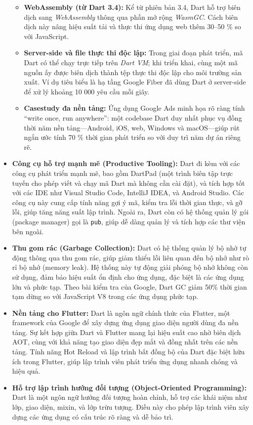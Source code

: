 \documentclass[../DoAn.tex]{subfiles}
\numberwithin{figure}{chapter}
\begin{document}
\begin{itemize}
\begin{itemize}
\item \textbf{WebAssembly (từ Dart 3.4):} Kể từ phiên bản 3.4, Dart hỗ trợ biên dịch sang \textit{WebAssembly} thông qua phần mở rộng \textit{WasmGC}. Cách biên dịch này nâng hiệu suất tải và thực thi ứng dụng web thêm 30–50 \% so với JavaScript.

\item \textbf{Server-side và file thực thi độc lập:} Trong giai đoạn phát triển, mã Dart có thể chạy trực tiếp trên \textit{Dart VM}; khi triển khai, cùng một mã nguồn ấy được biên dịch thành tệp thực thi độc lập cho môi trường sản xuất. Ví dụ tiêu biểu là hạ tầng Google Fiber đã dùng Dart ở server-side để xử lý khoảng 10 000 yêu cầu mỗi giây.

\item \textbf{Casestudy đa nền tảng:} Ứng dụng Google Ads minh họa rõ ràng tính “write once, run anywhere”: một codebase Dart duy nhất phục vụ đồng thời năm nền tảng—Android, iOS, web, Windows và macOS—giúp rút ngắn ước tính 70 \% thời gian phát triển so với duy trì năm dự án riêng rẽ.
\end{itemize}

    \item \textbf{Công cụ hỗ trợ mạnh mẽ (Productive Tooling):} 
    Dart đi kèm với các công cụ phát triển mạnh mẽ, bao gồm DartPad (một trình biên tập trực tuyến cho phép viết và chạy mã Dart mà không cần cài đặt), và tích hợp tốt với các IDE như Visual Studio Code, IntelliJ IDEA, và Android Studio. Các công cụ này cung cấp tính năng gợi ý mã, kiểm tra lỗi thời gian thực, và gỡ lỗi, giúp tăng năng suất lập trình. Ngoài ra, Dart còn có hệ thống quản lý gói (package manager) gọi là \texttt{pub}, giúp dễ dàng quản lý và tích hợp các thư viện bên ngoài.

    \item \textbf{Thu gom rác (Garbage Collection):} 
        Dart có hệ thống quản lý bộ nhớ tự động thông qua thu gom rác, giúp giảm thiểu lỗi liên quan đến bộ nhớ như rò rỉ bộ nhớ (memory leak). Hệ thống này tự động giải phóng bộ nhớ không còn sử dụng, đảm bảo hiệu suất ổn định cho ứng dụng, đặc biệt là các ứng dụng lớn và phức tạp.
        Theo bài kiểm tra của Google, Dart GC giảm 50\% thời gian tạm dừng so với JavaScript V8 trong các ứng dụng phức tạp.

    \item \textbf{Nền tảng cho Flutter:} 
    Dart là ngôn ngữ chính thức của Flutter, một framework của Google để xây dựng ứng dụng giao diện người dùng đa nền tảng. Sự kết hợp giữa Dart và Flutter mang lại hiệu suất cao nhờ biên dịch AOT, cùng với khả năng tạo giao diện đẹp mắt và đồng nhất trên các nền tảng. Tính năng Hot Reload và lập trình bất đồng bộ của Dart đặc biệt hữu ích trong Flutter, giúp lập trình viên phát triển ứng dụng nhanh chóng và hiệu quả.

    \item \textbf{Hỗ trợ lập trình hướng đối tượng (Object-Oriented Programming):} 
    Dart là một ngôn ngữ hướng đối tượng hoàn chỉnh, hỗ trợ các khái niệm như lớp, giao diện, mixin, và lớp trừu tượng. Điều này cho phép lập trình viên xây dựng các ứng dụng có cấu trúc rõ ràng và dễ bảo trì.
\end{itemize}
\end{document}
